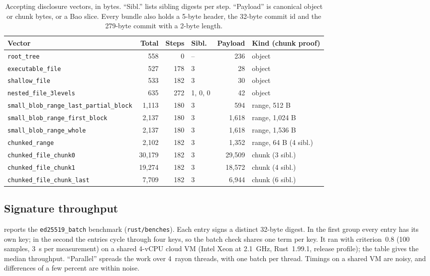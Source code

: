 \documentclass[10pt,letterpaper]{article}
\theoremstyle{remark}
\begin{document}
\begin{table}[!htb]
\centering\footnotesize\setlength{\tabcolsep}{3pt}
\caption{Accepting disclosure vectors, in bytes. ``Sibl.'' lists sibling
digests per step. ``Payload'' is canonical object or chunk bytes, or a Bao
slice. Every bundle also holds a 5-byte header, the 32-byte commit id and the 279-byte
commit with a 2-byte length.}
\label{tab:sizes-all}
\begin{tabular}{@{}lrrlrl@{}}
\toprule
Vector & Total & Steps & Sibl. & Payload & Kind (chunk proof) \\
\midrule
\texttt{root\_tree}                 &    558 &   0 & --      &    236 & object \\
\texttt{executable\_file}           &    527 & 178 & 3       &     28 & object \\
\texttt{shallow\_file}              &    533 & 182 & 3       &     30 & object \\
\texttt{nested\_file\_3levels}      &    635 & 272 & 1, 0, 0 &     42 & object \\
\texttt{small\_blob\_range\_last\_partial\_block} & 1,113 & 180 & 3 & 594 & range, 512 B \\
\texttt{small\_blob\_range\_first\_block}  & 2,137 & 180 & 3 & 1,618 & range, 1,024 B \\
\texttt{small\_blob\_range\_whole}  &  2,137 & 180 & 3       &  1,618 & range, 1,536 B \\
\texttt{chunked\_range}   & 2,102 & 182 & 3   &  1,352 & range, 64 B (4 sibl.) \\
\texttt{chunked\_file\_chunk0}      & 30,179 & 182 & 3       & 29,509 & chunk (3 sibl.) \\
\texttt{chunked\_file\_chunk1}      & 19,274 & 182 & 3       & 18,572 & chunk (4 sibl.) \\
\texttt{chunked\_file\_chunk\_last} & 7,709 & 182 & 3       & 6,944 & chunk (6 sibl.) \\
\bottomrule
\end{tabular}
\end{table}

\subsection{Signature throughput}\label{app:ed25519}

 reports the \texttt{ed25519\_batch} benchmark
(\texttt{rust/benches}). Each entry signs a distinct 32-byte digest. In the
first group every entry has its own key; in the second the entries cycle
through four keys, so the batch check shares one term per key. It ran with
criterion~0.8 (100 samples, 3~s per measurement) on a shared 4-vCPU cloud VM
(Intel Xeon at 2.1~GHz, Rust~1.99.1, release profile); the table gives the
median throughput. ``Parallel'' spreads the work over 4~rayon threads, with one
batch per thread. Timings on a shared VM are noisy, and differences of a few
percent are within noise.
\end{document}
